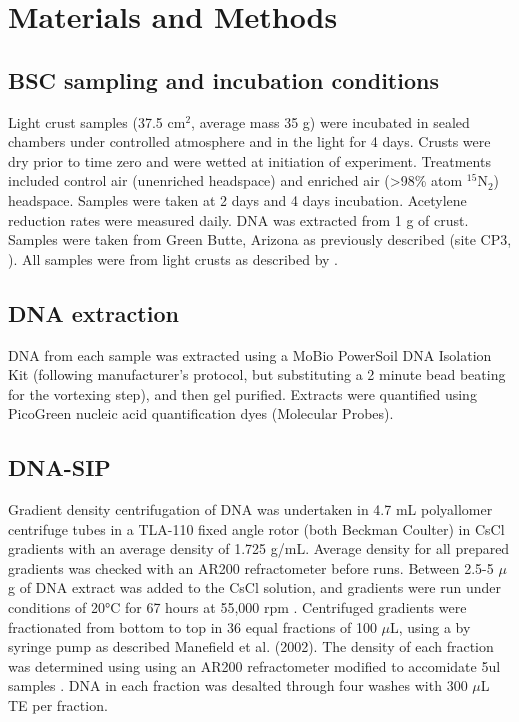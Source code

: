 \section{Materials and Methods}
\subsection{BSC sampling and incubation conditions}
Light crust samples (37.5 cm$^{2}$, average mass 35 g) were incubated in sealed
chambers under controlled atmosphere and in the light for 4 days. Crusts were
dry prior to time zero and were wetted at initiation of experiment. Treatments
included control air (unenriched headspace) and enriched air (\textgreater98\%
atom $^{15}$N$_{2}$) headspace. Samples were taken at 2 days and 4 days
incubation.  Acetylene reduction rates were measured daily. DNA was extracted
from 1 g of crust.  Samples were taken from Green Butte, Arizona as previously
described (site CP3, \citet{BERALDI_CAMPESI_2009}). All samples were from light
crusts as described by \cite{15643930}.
\subsection{DNA extraction}
DNA from each sample was extracted using a MoBio PowerSoil DNA Isolation Kit (following manufacturer’s protocol, but substituting a 2 minute bead beating for the vortexing step), and then gel purified. Extracts were quantified using PicoGreen nucleic acid quantification dyes (Molecular Probes). 
\subsection{DNA-SIP}
 Gradient density centrifugation of DNA was undertaken in 4.7 mL polyallomer
 centrifuge tubes in a TLA-110 fixed angle rotor (both Beckman Coulter) in CsCl
 gradients with an average density of 1.725 g/mL.  Average density for all
 prepared gradients was checked with an AR200 refractometer before runs.
 Between 2.5-5 $\mu$g of DNA extract was added to the CsCl solution, and
 gradients were run under conditions of 20°C for 67 hours at 55,000 rpm 
 \citep{17369332}. Centrifuged gradients were fractionated from bottom to
 top in 36 equal fractions of 100 $\mu$L, using a by syringe pump as described
 Manefield et al. (2002). The density of each fraction was determined using
 using an AR200 refractometer modified to accomidate 5ul
 samples \citep{17369332}. DNA in each fraction was desalted through four washes
 with 300 $\mu$L TE per fraction.  
